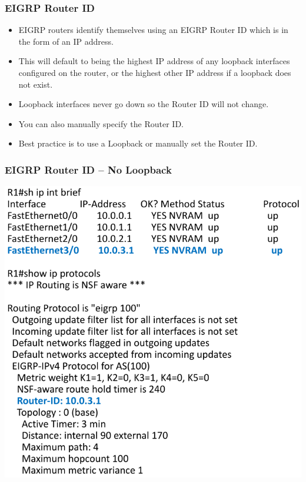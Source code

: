 \documentclass[pdflatex,compress,mathserif]{beamer}
\begin{document}
\begin{frame}
	\frametitle{EIGRP Router ID}
	\begin{itemize}
		\item EIGRP routers identify themselves using an EIGRP Router ID which is in
the form of an IP address.
		\item This will default to being the highest IP address of any loopback
interfaces configured on the router, or the highest other IP address if a
loopback does not exist.
		\item Loopback interfaces never go down so the Router ID will not change.
		\item You can also manually specify the Router ID.
		\item Best practice is to use a Loopback or manually set the Router ID.
	\end{itemize}
\end{frame}

\begin{frame}
	\frametitle{EIGRP Router ID – No Loopback}
	\begin{center}
		\includegraphics[width=0.6\linewidth]{img/img20}
	\end{center}
\end{frame}
\end{document}
